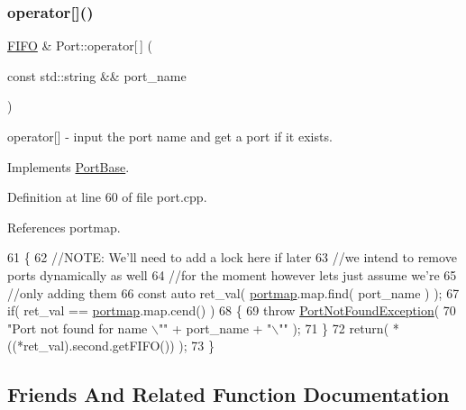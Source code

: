 \subsubsection{\texorpdfstring{operator[]()}{operator[]()}}
{\footnotesize\ttfamily \hyperlink{class_f_i_f_o}{F\+I\+FO} \& Port\+::operator\mbox{[}$\,$\mbox{]} (\begin{DoxyParamCaption}\item[{const std\+::string \&\&}]{port\+\_\+name }\end{DoxyParamCaption})\hspace{0.3cm}{\ttfamily [virtual]}}

operator\mbox{[}\mbox{]} -\/ input the port name and get a port if it exists. 

Implements \hyperlink{class_port_base_ad034502b053f3cd7939d651b2d72cd0a}{Port\+Base}.



Definition at line 60 of file port.\+cpp.



References portmap.


\begin{DoxyCode}
61 \{
62    \textcolor{comment}{//NOTE: We'll need to add a lock here if later}
63    \textcolor{comment}{//we intend to remove ports dynamically as well}
64    \textcolor{comment}{//for the moment however lets just assume we're}
65    \textcolor{comment}{//only adding them}
66    \textcolor{keyword}{const} \textcolor{keyword}{auto} ret\_val( \hyperlink{class_port_a537a8a0c2a47acbf8654f286200aee90}{portmap}.map.find( port\_name ) );
67    \textcolor{keywordflow}{if}( ret\_val == \hyperlink{class_port_a537a8a0c2a47acbf8654f286200aee90}{portmap}.map.cend() )
68    \{
69       \textcolor{keywordflow}{throw} \hyperlink{class_port_not_found_exception}{PortNotFoundException}( 
70          \textcolor{stringliteral}{"Port not found for name \(\backslash\)""} + port\_name + \textcolor{stringliteral}{"\(\backslash\)""} );
71    \}
72    \textcolor{keywordflow}{return}( *((*ret\_val).second.getFIFO())  );
73 \}
\end{DoxyCode}


\subsection{Friends And Related Function Documentation}
\hypertarget{class_port_aed45534b6a99d5630dcfa9eedbe023fc}{}\label{class_port_aed45534b6a99d5630dcfa9eedbe023fc} 
